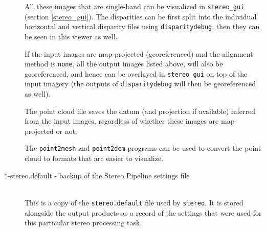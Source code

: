 \begin{description}
All these images that are single-band can be visualized in
\texttt{stereo\_gui} (section \ref{stereo_gui}). The disparities
can be first split into the individual horizontal and vertical
disparity files using \texttt{disparitydebug}, then they can be
seen in this viewer as well.

If the input images are map-projected (georeferenced) and the alignment
method is \texttt{none}, all the output images listed above, will also
be georeferenced, and hence can be overlayed in \texttt{stereo\_gui} on
top of the input imagery (the outputs of \texttt{disparitydebug} will
then be georeferenced as well).

The point cloud file saves the datum (and projection if available)
inferred from the input images, regardless of whether these images
are map-projected or not.

The {\tt point2mesh} and {\tt point2dem} programs can be used
to convert the point cloud to formats that are easier to visualize.

\item[*-stereo.default \textnormal{- backup of the Stereo Pipeline settings file}] \hfill \\
  This is a copy of the \texttt{stereo.default} file used by
  \texttt{stereo}.  It is stored alongside the output products as
  a record of the settings that were used for this particular stereo
  processing task.

\end{description}
